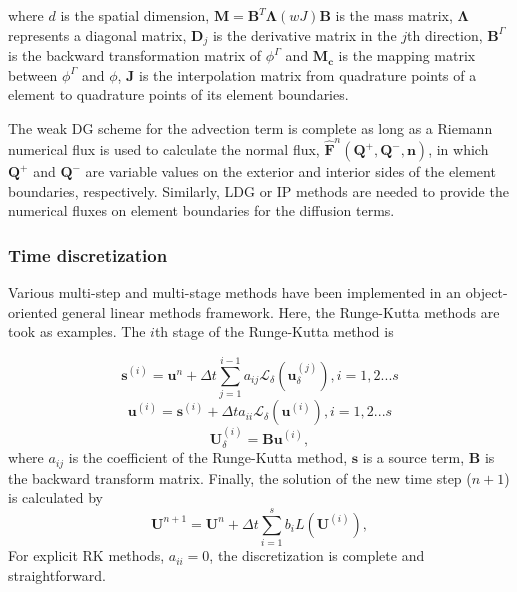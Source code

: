       where $d$ is the spatial dimension,  $\mathbf{M}=\mathbf{B}^{T}\mathbf{\Lambda}\left(wJ\right)\mathbf{B}$
      is the mass matrix, $\mathbf{\Lambda}$ represents
      a diagonal matrix, $\mathbf{D}_{j}$ is the derivative matrix in
      the $j$th direction, $\mathbf{B}^{\varGamma}$ is the backward transformation
      matrix of $\phi^{\varGamma}$ and $\mathbf{M_{c}}$
      is the mapping matrix between $\phi^{\varGamma}$ and $\phi$, $\mathbf{J}$ is the interpolation matrix from quadrature points of a element to quadrature points of its element boundaries.

      The weak DG scheme for the advection term is complete as long as a
      Riemann numerical flux is used to calculate the normal flux,
      $\hat{\mathbf{F}}^{n}\left(\mathbf{Q}^{+},\mathbf{Q}^{-},\mathbf{n}\right)$,
      in which $\mathbf{Q}^{+}$ and $\mathbf{Q}^{-}$ are variable values
      on the exterior and interior sides of the element boundaries, respectively. Similarly, LDG or IP methods are needed to provide the numerical fluxes on element boundaries for the diffusion terms.
    \subsubsection{{Time discretization}}\label{sec:temporalDiscretization}
      Various multi-step and multi-stage methods have been implemented in an object-oriented general linear methods framework. Here, the Runge-Kutta methods are took as examples. The $i$th stage of the Runge-Kutta method is             
          
      \begin{equation}\label{eq:ESDIRKStages_coeffS}
              \textbf{s}^{(i)}
        =\textbf{u}^{n}+\Delta t \sum^{i-1}_{j=1}{a_{ij}\mathcal{L}_\delta\left(\textbf{u}_{\delta}^{(j)}\right)}
        , i=1,2...s    
      \end{equation}
      \begin{equation}\label{eq:ESDIRKStages_coeff}
        \textbf{u}^{(i)}=\textbf{s}^{(i)}+\Delta t a_{ii} \mathcal{L}_\delta\left(\textbf{u}^{(i)}\right)
        , i=1,2...s  
      \end{equation}    
      \begin{equation}
          \textbf{U}_{\delta}^{(i)} = \textbf{B} \textbf{u}^{(i)},\label{eq:ESDIRKStages_coeffBWD}
      \end{equation}
      where $a_{ij}$ is the coefficient of the Runge-Kutta method, $\textbf{s}$ is a source term, $\textbf{B}$ is  the backward transform matrix.
      Finally, the solution of the new time step ($n+1$) is calculated by
      \begin{equation}\label{eq:URKUpdate}
        \textbf{U}^{n+1}=\textbf{U}^{n}+\Delta t\sum^{s}_{i=1}{b_{i} \textit{L}\left(\textbf{U}^{(i)}\right)}
        ,
      \end{equation}
      For explicit RK methods, $a_{ii} =0$, the discretization is complete and straightforward. 
